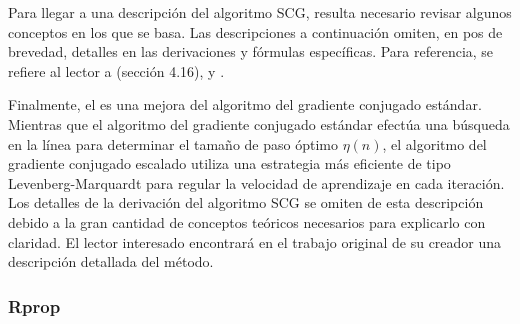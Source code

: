 Para llegar a una descripción del algoritmo SCG, resulta necesario
revisar algunos conceptos en los que se basa. Las descripciones a
continuación omiten, en pos de brevedad, detalles en las derivaciones
y fórmulas específicas. Para referencia, se refiere al lector a
\cite{haykin} (sección 4.16), \cite{riedmiller} y \cite{scg}.

Finalmente, el  es una
mejora del algoritmo del gradiente conjugado estándar.  Mientras que
el algoritmo del gradiente conjugado estándar efectúa una búsqueda en
la línea para determinar el tamaño de paso óptimo $\eta(n)$, el
algoritmo del gradiente conjugado escalado utiliza una estrategia más
eficiente de tipo Levenberg-Marquardt para regular la velocidad de
aprendizaje en cada iteración.
Los detalles de la derivación del algoritmo SCG se omiten de esta
descripción debido a la gran cantidad de conceptos teóricos necesarios
para explicarlo con claridad. El lector interesado encontrará en el
trabajo original de su creador \cite{scg} una descripción detallada
del método.
%
\subsubsection{Rprop}
%

